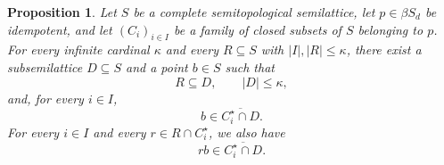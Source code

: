 \documentclass[11pt,a4paper]{article}
\newtheorem{proposition}[theorem]{Proposition}
\theoremstyle{definition}
\theoremstyle{remark}
\numberwithin{equation}{section}
\newcommand{\cl}[1]{\overline{#1}}
\begin{document}
\begin{proposition}\label{prop:simultaneous}
Let \(S\) be a complete semitopological semilattice, let
\(p\in\beta S_d\) be idempotent, and let \((C_i)_{i\in I}\) be a family
of closed subsets of \(S\) belonging to \(p\).
For every infinite cardinal \(\kappa\) and every \(R\subseteq S\) with
\(|I|,|R|\le\kappa\), there exist a subsemilattice \(D\subseteq S\) and
a point \(b\in S\) such that
\begin{equation}\label{eq:support}
R\subseteq D,\qquad |D|\le\kappa,
\end{equation}
and, for every \(i\in I\),
\begin{equation}\label{eq:pure}
b\in\cl{C_i^\star\cap D}.
\end{equation}
For every \(i\in I\) and every \(r\in R\cap C_i^\star\), we also have
\begin{equation}\label{eq:weighted}
rb\in\cl{C_i^\star\cap D}.
\end{equation}
\end{proposition}
\end{document}
